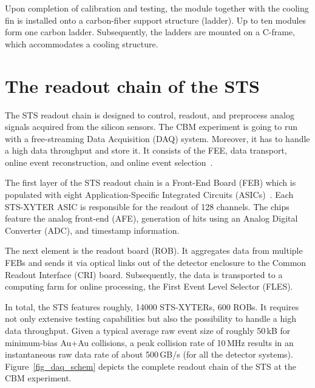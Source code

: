 Upon completion of calibration and testing, the module together with the cooling fin is installed onto a carbon-fiber support structure (ladder). Up to ten modules form one carbon ladder. Subsequently, the ladders are mounted on a C-frame, which accommodates a cooling structure. 
\section{The readout chain of the STS}
\label{readout}
\label{DAQ}
The \gls{STS} readout chain is designed to control, readout, and preprocess analog signals acquired from the silicon sensors. The \gls{CBM} experiment is going to run with a free-streaming Data Acquisition (\gls{DAQ}) system. Moreover, it has to handle a high data throughput and store it. It consists of the \gls{FEE}, data transport, online event reconstruction, and online event selection~\cite{Kasinski1}.

The first layer of the \gls{STS} readout chain is a Front-End Board (\gls{FEB}) which is populated with eight Application-Specific Integrated Circuits (ASICs)~\cite{Kasinski2}. Each STS-XYTER \gls{ASIC} is responsible for the readout of 128 channels. The chips feature the analog front-end (\gls{AFE}), generation of hits using an Analog Digital Converter (\gls{ADC}), and timestamp information. 

The next element is the readout board (\gls{ROB}). It aggregates data from multiple \glspl{FEB} and sends it via optical links out of the detector enclosure to the Common Readout Interface (\gls{CRI}) board. Subsequently, the data is transported to a computing farm for online processing, the First Event Level Selector (\gls{FLES}). 

In total, the \gls{STS} features roughly, 14000 STS-XYTERs, 600 \glspl{ROB}. It requires not only extensive testing capabilities but also the possibility to handle a high data throughput. Given a typical average raw event size of roughly 50\,kB for minimum-bias Au+Au collisions, a peak collision rate of 10\,MHz results in an instantaneous raw data rate of about 500\,GB/s (for all the detector systems). Figure~\ref{fig_daq_schem} depicts the complete readout chain of the \gls{STS} at the \gls{CBM} experiment. 

